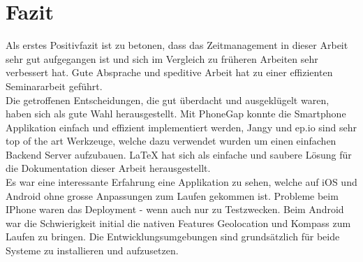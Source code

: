 
\newpage
\section{Fazit} %
\label{sec:Fazit}

Als erstes Positivfazit ist zu betonen, dass das Zeitmanagement in dieser Arbeit sehr gut aufgegangen ist und sich im Vergleich zu früheren Arbeiten sehr verbessert hat. Gute Absprache und speditive Arbeit hat zu einer effizienten Seminararbeit geführt.\\
Die getroffenen Entscheidungen, die gut überdacht und ausgeklügelt waren, haben sich als gute Wahl herausgestellt. Mit PhoneGap konnte die Smartphone Applikation einfach und effizient implementiert werden, Jangy und ep.io sind sehr top of the art Werkzeuge, welche dazu verwendet wurden um einen einfachen Backend Server aufzubauen. LaTeX hat sich als einfache und saubere Lösung für die Dokumentation dieser Arbeit herausgestellt.\\
Es war eine interessante Erfahrung eine Applikation zu sehen, welche auf iOS und Android ohne grosse Anpassungen zum Laufen gekommen ist. Probleme beim IPhone waren das Deployment - wenn auch nur zu Testzwecken. Beim Android war die Schwierigkeit initial die nativen Features Geolocation und Kompass zum Laufen zu bringen. Die Entwicklungsumgebungen sind grundsätzlich für beide Systeme zu installieren und aufzusetzen. 

